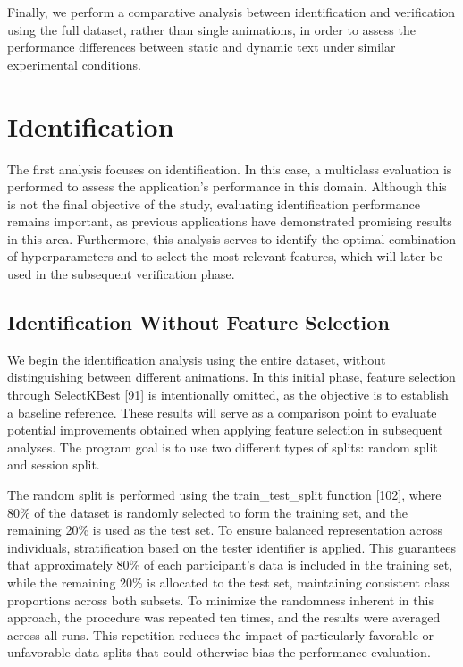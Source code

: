 \documentclass[12pt]{report}
\begin{document}
Finally, we perform a comparative analysis between identification and verification using the full dataset, rather than single animations, in order to assess the performance differences between static and dynamic text under similar experimental conditions.

\section{Identification}
The first analysis focuses on identification.
In this case, a multiclass evaluation is performed to assess the application's performance in this domain. 
Although this is not the final objective of the study, evaluating identification performance remains important, as previous applications have demonstrated promising results in this area.
Furthermore, this analysis serves to identify the optimal combination of hyperparameters and to select the most relevant features, which will later be used in the subsequent verification phase.

\subsection{Identification Without Feature Selection}
\label{subsec:id_fs_ch}

We begin the identification analysis using the entire dataset, without distinguishing between different animations.
In this initial phase, feature selection through SelectKBest [91] is intentionally omitted, as the objective is to establish a baseline reference. 
These results will serve as a comparison point to evaluate potential improvements obtained when applying feature selection in subsequent analyses.
The program goal is to use two different types of splits: random split and session split.

The random split is performed using the train\_test\_split function [102], where 80\% of the dataset is randomly selected to form the training set, and the remaining 20\% is used as the test set.
To ensure balanced representation across individuals, stratification based on the tester identifier is applied.
This guarantees that approximately 80\% of each participant's data is included in the training set, while the remaining 20\% is allocated to the test set, maintaining consistent class proportions across both subsets.
To minimize the randomness inherent in this approach, the procedure was repeated ten times, and the results were averaged across all runs.
This repetition reduces the impact of particularly favorable or unfavorable data splits that could otherwise bias the performance evaluation.
\end{document}
